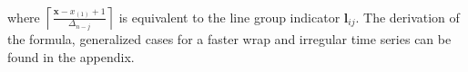 \documentclass[12pt]{article}
\begin{document}
\begin{itemize}
%
%

where $\left\lceil \frac{\mathbf{x}-x_{(1)}+1}{\Delta_{n-j}}\right\rceil$
is equivalent to the line group indicator $\mathbf{l}{}_{ij}$.
The derivation of the formula, generalized cases for a faster
wrap and irregular time series can be found in the appendix.





\end{itemize}
\end{document}
